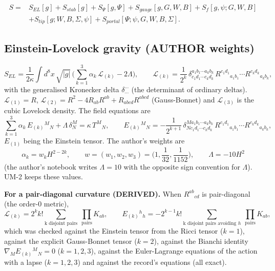 \documentclass[
  10pt,
]{article}
\begin{document}
\[ \begin{aligned} S = {}& S_{EL}[g] + S_{stab}[g] + S_\Psi[g, \Psi] + S_{gauge}[g, G, W, B] + S_{f}[g, \psi; G, W, B]\\
   &+ S_{tip}[g; W, B, \Sigma, \psi] + S_{portal}[\Psi; \psi, G, W, B, \Sigma] . \end{aligned} \]

\hypertarget{einstein-lovelock-gravity-author-weights}{%
\subsection{Einstein-Lovelock gravity (AUTHOR
weights)}\label{einstein-lovelock-gravity-author-weights}}

\[ S_{EL} = \frac{1}{2\kappa}\int d^8x\,\sqrt{|g|}\,\Big(\sum_{k=1}^{3}\alpha_k\,\mathcal L_{(k)} - 2\Lambda\Big), \qquad
   \mathcal L_{(k)} = \frac{1}{2^k}\,\delta^{a_1b_1\cdots a_kb_k}_{c_1d_1\cdots c_kd_k}\,
   R^{c_1d_1}{}_{a_1b_1}\cdots R^{c_kd_k}{}_{a_kb_k}, \] with the
generalised Kronecker delta \(\delta^{\cdots}_{\cdots}\) (the
determinant of ordinary deltas). \(\mathcal L_{(1)} = R\),
\(\mathcal L_{(2)} = R^2 - 4R_{ab}R^{ab} + R_{abcd}R^{abcd}\)
(Gauss-Bonnet) and \(\mathcal L_{(3)}\) is the cubic Lovelock density.
The field equations are
\[ \sum_{k=1}^{3}\alpha_k\,E_{(k)}{}^M{}_N + \Lambda\,\delta^M_N = \kappa\,T^M{}_N, \qquad
   E_{(k)}{}^M{}_N = -\frac{1}{2^{k+1}}\,\delta^{M a_1 b_1\cdots a_k b_k}_{N c_1 d_1\cdots c_k d_k}\,
   R^{c_1d_1}{}_{a_1b_1}\cdots R^{c_kd_k}{}_{a_kb_k}, \] \(E_{(1)}\)
being the Einstein tensor. The author's weights are
\[ \alpha_k = w_k H^{2-2k}, \qquad w = (w_1, w_2, w_3) = \Big(1, \frac{1}{32}, \frac{1}{1152}\Big), \qquad \Lambda = -10H^2 \]
(the author's notebook writes \(\Lambda = 10\) with the opposite sign
convention for \(\Lambda\)). UM-2 keeps these values.

\textbf{For a pair-diagonal curvature (DERIVED).} When \(R^{ab}{}_{cd}\)
is pair-diagonal (the order-0 metric),
\[ \mathcal L_{(k)} = 2^k k! \sum_{\text{k disjoint pairs}}\ \prod_{\text{pairs}} K_{ab}, \qquad
   E_{(k)}{}^h{}_h = -2^{k-1} k!\!\!\sum_{\text{k disjoint pairs avoiding } h}\ \prod_{\text{pairs}} K_{ab}, \]
which was checked against the Einstein tensor from the Ricci tensor
(\(k = 1\)), against the explicit Gauss-Bonnet tensor (\(k = 2\)),
against the Bianchi identity \(\nabla_M E_{(k)}{}^M{}_N = 0\)
(\(k = 1, 2, 3\)), against the Euler-Lagrange equations of the action
with a lapse (\(k = 1, 2, 3\)) and against the record's equations (all
exact).
\end{document}
